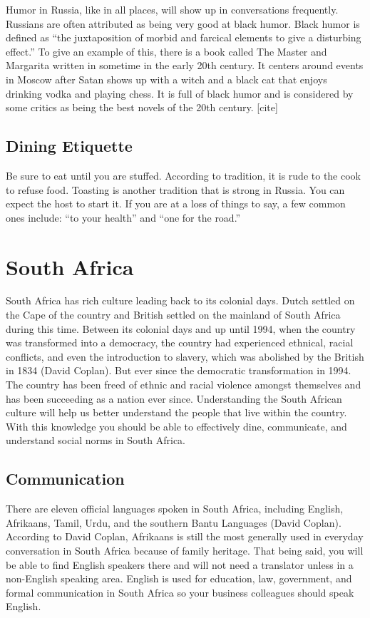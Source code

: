 \documentclass[11pt,a4paper,twoside]{report}
\begin{document}
Humor in Russia, like in all places, will show up in conversations frequently.
Russians are often attributed as being very good at black humor. Black humor is
defined as “the juxtaposition of morbid and farcical elements to give a
disturbing effect.” To give an example of this, there is a book called The
Master and Margarita written in sometime in the early 20th century. It centers
around events in Moscow after Satan shows up with a witch and a black cat that
enjoys drinking vodka and playing chess. It is full of black humor and is
considered by some critics as being the best novels of the 20th century. [cite]

\section{Dining Etiquette}

Be sure to eat until you are stuffed. According to tradition, it is rude to the
cook to refuse food. Toasting is another tradition that is strong in Russia.
You can expect the host to start it. If you are at a loss of things to say, a
few common ones include: “to your health” and “one for the road.”

\chapter{South Africa}

South Africa has rich culture leading back to its colonial days. Dutch settled
on the Cape of the country and British settled on the mainland of South Africa
during this time. Between its colonial days and up until 1994, when the country
was transformed into a democracy, the country had experienced ethnical, racial
conflicts, and even the introduction to slavery, which was abolished by the
British in 1834 (David Coplan). But ever since the democratic transformation in
1994. The country has been freed of ethnic and racial violence amongst
themselves and has been succeeding as a nation ever since. Understanding the
South African culture will help us better understand the people that live
within the country. With this knowledge you should be able to effectively dine,
communicate, and understand social norms in South Africa.

\section{Communication}

There are eleven official languages spoken in South Africa, including English,
Afrikaans, Tamil, Urdu, and the southern Bantu Languages (David Coplan).
According to David Coplan, Afrikaans is still the most generally used in
everyday conversation in South Africa because of family heritage. That being
said, you will be able to find English speakers there and will not need a
translator unless in a non-English speaking area. English is used for
education, law, government, and formal communication in South Africa so your
business colleagues should speak English.
\end{document}
